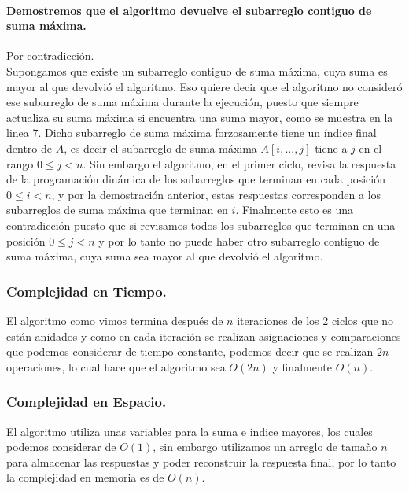 \documentclass[12pt]{article}
\begin{document}
\paragraph{Demostremos que el algoritmo devuelve el subarreglo contiguo de suma máxima.}
Por contradicción.\\
Supongamos que existe un subarreglo contiguo de suma máxima, cuya suma es mayor al que devolvió el algoritmo. Eso quiere decir que el algoritmo no consideró ese subarreglo de suma máxima durante la ejecución, puesto que siempre actualiza su suma máxima si encuentra una suma mayor, como se muestra en la linea $7$. Dicho subarreglo de suma máxima forzosamente tiene un índice final dentro de $A$, es decir el subarreglo de suma máxima $A[i,...,j]$ tiene a $j$ en el rango $0\leq j < n$. Sin embargo el algoritmo, en el primer ciclo, revisa la respuesta de la programación dinámica de los subarreglos que terminan en cada posición $0\leq i < n$, y por la demostración anterior, estas respuestas corresponden a los subarreglos de suma máxima que terminan en $i$. Finalmente esto es una contradicción puesto que si revisamos todos los subarreglos que terminan en una posición $0\leq j < n$ y por lo tanto no puede haber otro subarreglo contiguo de suma máxima, cuya suma sea mayor al que devolvió el algoritmo.\\
\subsubsection{Complejidad en Tiempo.}
El algoritmo como vimos termina después de $n$ iteraciones de los 2 ciclos que no están anidados y como en cada iteración se realizan asignaciones y comparaciones que podemos considerar de tiempo constante, podemos decir que se realizan $2n$ operaciones, lo cual hace que el algoritmo sea $O(2n)$ y finalmente $O(n)$.
 \subsubsection{Complejidad en Espacio.}
 El algoritmo utiliza unas variables para la suma e indice mayores, los cuales podemos considerar de $O(1)$, sin embargo utilizamos un arreglo de tamaño $n$ para almacenar las respuestas y poder reconstruir la respuesta final, por lo tanto la complejidad en memoria es de $O(n)$.
\end{document}
